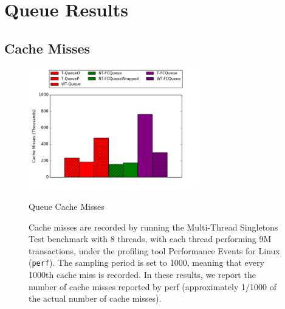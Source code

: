 \chapter{Queue Results}
\label{app:queues}

\vspace{-20pt}
\section{Cache Misses}
\begin{figure}[H]
    \centering
    \includegraphics[width=0.66\textwidth]{fcqueues/cm.png}
    \caption{Queue Cache Misses}
    \caption*{
Cache misses are recorded by running the Multi-Thread Singletons Test benchmark with 8 threads, with each thread performing 9M transactions, under the profiling tool Performance Events for Linux (\texttt{perf}). The sampling period is set to 1000, meaning that every 1000th cache miss is recorded.
    In these results, we report the number of cache misses reported by perf (approximately 1/1000 of the actual number of cache misses).}
\label{fig:qcm}
\end{figure}

